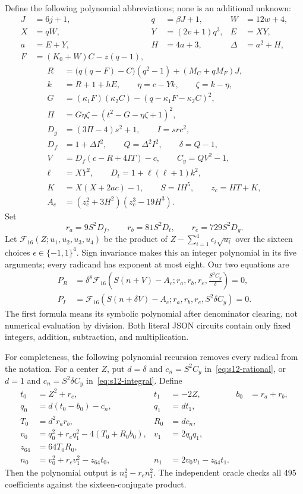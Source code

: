 Define the following polynomial abbreviations; none is an additional
unknown:
\begin{align*}
 J&=6j+1,&q&=\beta J+1,&W&=12w+4,\\
 X&=qW,&Y&=(2v+1)q^3,&E&=XY,\\
 a&=E+Y,&H&=4a+3,&\Delta&=a^2+H,\\
 F&=(K_0+W)C-z(q-1),&&&
\end{align*}
\begin{align*}
 R&=\bigl(q(q-F)-C\bigr)(q^2-1)+(M_C+qM_F)J,\\
 k&=R+1+hE,\qquad \eta=c-Yk,\qquad \zeta=k-\eta,\\
 G&=(\kappa_1F)(\kappa_2C)-(q-\kappa_1F-\kappa_2C)^2,\\
 \Pi&=G\eta\zeta-(t^2-G-\eta\zeta+1)^2,\\
 D_g&=(3\Pi-4)s^2+1,\qquad I=src^2,\\
 D_f&=1+\Delta I^2,\qquad Q=\Delta^2I^2,\qquad\delta=Q-1,\\
 V&=D_f(c-R+4IT)-c,\qquad C_y=QV^2-1,\\
 \ell&=XY^2,\qquad D_t=1+\ell(\ell+1)k^2,\\
 K&=X(X+2ac)-1,\qquad S=IH^5,\qquad z_c=HT+K,\\
 A_c&=(z_c^2+3H^2)(z_c^3-19H^3).
\end{align*}
Set
\[
 r_a=9S^2D_f,\qquad r_b=81S^2D_t,\qquad r_e=729S^2D_g.
\]
Let $\mathcal F_{16}(Z;u_1,u_2,u_3,u_4)$ be the product of
$Z-\sum_{i=1}^4\epsilon_i\sqrt{u_i}$ over the sixteen choices
$\epsilon\in\{-1,1\}^4$.  Sign invariance makes this an integer
polynomial in its five arguments; every radicand has exponent at most
eight.  Our two equations are
\begin{align}
 P_R&=\delta^8\mathcal F_{16}
 \left(S(n+V)-A_c; r_a,r_b,r_e,\frac{S^2C_y}{\delta}\right)=0,
 \label{eq:s12-rational}\\
 P_I&=\mathcal F_{16}
 \left(S(n+\delta V)-A_c; r_a,r_b,r_e,S^2\delta C_y\right)=0.
 \label{eq:s12-integral}
\end{align}
The first formula means its symbolic polynomial after denominator
clearing, not numerical evaluation by division.  Both literal JSON
circuits contain only fixed integers, addition, subtraction, and
multiplication.

For completeness, the following polynomial recursion removes every
radical from the notation.  For a center $Z$, put $d=\delta$ and
$c_n=S^2C_y$ in~\eqref{eq:s12-rational}, or $d=1$ and
$c_n=S^2\delta C_y$ in~\eqref{eq:s12-integral}.  Define
\begin{align*}
 t_0&=Z^2+r_e,& t_1&=-2Z,& b_0&=r_a+r_b,\\
 q_0&=d(t_0-b_0)-c_n,&q_1&=dt_1,\\
 T_0&=d^2r_ar_b,&R_0&=dc_n,\\
 v_0&=q_0^2+r_eq_1^2-4(T_0+R_0b_0),&v_1&=2q_0q_1,\\
 z_{64}&=64T_0R_0,&&\\
 n_0&=v_0^2+r_ev_1^2-z_{64}t_0,&
 n_1&=2v_0v_1-z_{64}t_1.
\end{align*}
Then the polynomial output is $n_0^2-r_en_1^2$.  The independent oracle
checks all 495 coefficients against the sixteen-conjugate product.

